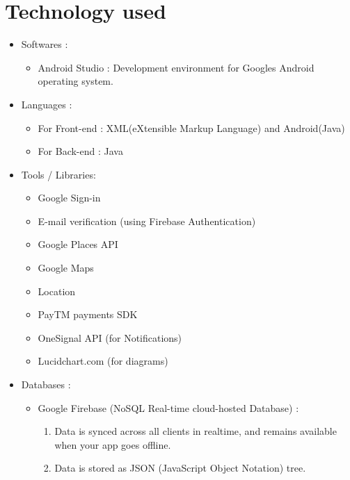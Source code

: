 \documentclass{report}
\begin{document}
\chapter{Technology used}
\bigskip
\bigskip
\begin{itemize}[label=$\diamond$]
\item Softwares :
\begin{itemize}[label=$\rightarrow$]
\item Android Studio : Development environment for Google\textquotesingle s Android operating system.
\end{itemize}
\item Languages :
\begin{itemize}[label=$\rightarrow$]
\item For Front-end : XML(eXtensible Markup Language) and Android(Java)
\item For Back-end : Java
\end{itemize}

\item Tools / Libraries:
\begin{itemize}[label=$\rightarrow$]
\item Google Sign-in
\item E-mail verification (using Firebase Authentication)
\item Google Places API
\item Google Maps
\item Location
\item PayTM payments SDK
\item OneSignal API (for Notifications)
\item Lucidchart.com (for diagrams)
\end{itemize}

\item Databases :
\begin{itemize}[label=$\rightarrow$]
\item Google Firebase (NoSQL Real-time cloud-hosted Database) :
\begin{enumerate}
\item Data is synced across all clients in realtime, and remains available when your app goes offline.
\item Data is stored as JSON (JavaScript Object Notation) tree.
\end{enumerate}
\end{itemize}

\end{itemize}
\end{document}
